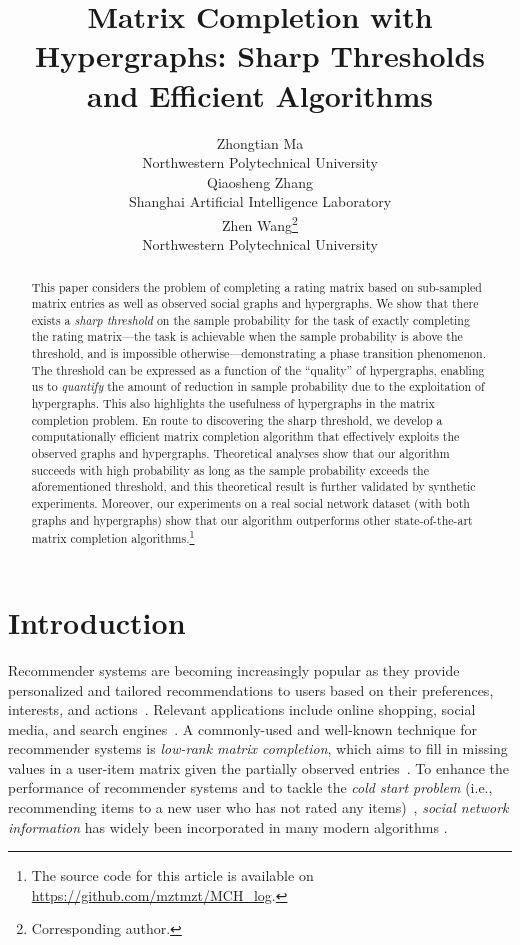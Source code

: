 \documentclass{article}
\title{Matrix Completion with Hypergraphs: Sharp Thresholds and Efficient Algorithms}
\author[Z. Ma et al.]{%
Zhongtian Ma\\
Northwestern Polytechnical University \\
\email{mazhongtian@mail.nwpu.edu.cn}\And
Qiaosheng Zhang\\
Shanghai Artificial Intelligence Laboratory\\
\email{zhangqiaosheng@pjlab.org.cn}\And
Zhen Wang\thanks{Corresponding author.}\\
Northwestern Polytechnical University\\
\email{w-zhen@nwpu.edu.cn}
}
\begin{document}
\maketitle

\begin{abstract}
This paper considers the problem of completing a rating matrix based on sub-sampled matrix entries as well as observed social graphs and hypergraphs. We show that there exists a \emph{sharp threshold} on the sample probability for the task of exactly completing the rating matrix---the task is achievable when the sample probability is above the threshold, and is impossible otherwise---demonstrating a phase transition phenomenon. The threshold can be expressed as a function of the ``quality'' of hypergraphs, enabling us to  \emph{quantify} the amount of reduction in sample probability due to the exploitation of hypergraphs. This also highlights the usefulness of hypergraphs in the matrix completion problem. En route to discovering the sharp threshold, we develop a computationally efficient matrix completion algorithm that effectively exploits the observed graphs and hypergraphs. Theoretical analyses show that our algorithm succeeds with high probability as long as the sample probability exceeds the aforementioned threshold, and this theoretical result is further validated by synthetic experiments.  Moreover, our experiments on a real social network dataset (with both graphs and hypergraphs) show
that our algorithm outperforms other state-of-the-art matrix completion algorithms.\footnote{The source code for this article is available on \url{https://github.com/mztmzt/MCH_log}.}
\end{abstract}

\section{Introduction}\label{sec:intro}
Recommender systems are becoming increasingly popular as they provide personalized and tailored recommendations to users based on their preferences, interests, and actions~\citep{lu2012recommender, ricci2015recommender}. Relevant applications include online shopping, social media, and search engines~\citep{sivapalan2014recommender, guy2011social}. A commonly-used and well-known technique for recommender systems is \emph{low-rank matrix completion}, which aims to fill in missing values in a user-item matrix given the partially observed entries~\citep{keshavan2010matrix, ramlatchan2018survey}. To enhance the performance of recommender systems and to tackle the \emph{cold start problem} (i.e., recommending items to a new user who has not rated any items)~\citep{lika2014facing}, \emph{social network information} has widely been incorporated in many modern algorithms \citep{camacho2018social, sedhain2014social, zhao2015connecting}. 
\end{document}
